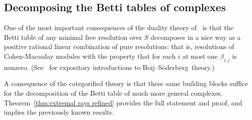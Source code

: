 \documentclass[12pt]{amsart}
\theoremstyle{definition}
\theoremstyle{remark}
\newcommand{\codim}{\operatorname{codim}}
\newcommand{\cE}{\mathcal{E}}
\newcommand{\FF}{\mathbf{F}}
\newcommand{\david}[1]{{\color{red} \sf $\clubsuit\clubsuit\clubsuit$ David: [#1]}}
\def\BS{Boij--S\"oderberg~}
\begin{document}
%
\subsection*{Decomposing the Betti tables of complexes}


One of the most important consequences of the duality theory of~\cites{eis-schrey1,boij-sod2} is that the Betti table of any minimal free resolution over $S$ decomposes in a nice way as a positive rational linear combination of pure resolutions: that is, resolutions of Cohen-Macaulay modules with the property that for each $i$ at most one $\beta_{i,j}$ is nonzero. (See~\cites{eis-schrey-icm,floystad-expository} for expository introductions to \BS theory.)

A consequence of the categorified theory is that these same building blocks suffice for the decomposition of the Betti table of much more general complexes.
Theorem~\ref{thm:extremal rays refined} provides the full statement and proof, and implies the previously known results.
\end{document}
